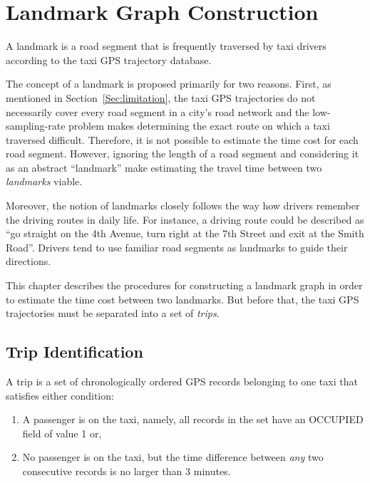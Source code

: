 \chapter{Landmark Graph Construction}
\begin{defn}\label{Def:ldmk}
A landmark is a road segment that is frequently traversed by taxi drivers according to the taxi GPS trajectory database. \cite{TDR10}
\end{defn}

The concept of a landmark is proposed primarily for two reasons. First, as mentioned in Section~\ref{Sec:limitation}, the taxi GPS trajectories do not necessarily cover every road segment in a city's road network and the low-sampling-rate problem makes determining the exact route on which a taxi traversed difficult. Therefore, it is not possible to estimate the time cost for each road segment. However, ignoring the length of a road segment and considering it as an abstract ``landmark'' make estimating the travel time between two \emph{landmarks} viable. 

Moreover, the notion of landmarks closely follows the way how drivers remember the driving routes in daily life\cite{TDR10}. For instance, a driving route could be described as ``go straight on the 4th Avenue, turn right at the 7th Street and exit at the Smith Road''. Drivers tend to use familiar road segments as landmarks to guide their directions.

This chapter describes the procedures for constructing a landmark graph in order to estimate the time cost between two landmarks. But before that, the taxi GPS trajectories must be separated into a set of \emph{trips}.

\section{Trip Identification}
\begin{defn}\label{Def:trip}
A trip is a set of chronologically ordered GPS records belonging to one taxi that satisfies either condition:
\begin{enumerate}
\item A passenger is on the taxi, namely, all records in the set have an OCCUPIED field of value 1 or, 
\item No passenger is on the taxi, but the time difference between \emph{any} two consecutive records is no larger than 3 minutes.
\end{enumerate}
\end{defn}

